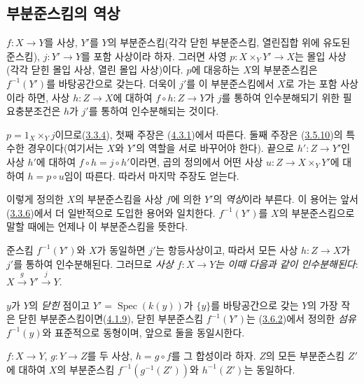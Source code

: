 \subsection{부분준스킴의 역상}
\label{subsection:I.4.4-ko}

\begin{proposition}[4.4.1]
\label{I.4.4.1-ko}
$f:X\to Y$를 사상, $Y'$를 $Y$의 부분준스킴(각각 닫힌 부분준스킴,
열린집합 위에 유도된 준스킴), $j:Y'\to Y$를 포함 사상이라 하자.
그러면 사영 $p:X\times_Y Y'\to X$는 몰입 사상(각각 닫힌 몰입 사상,
열린 몰입 사상)이다. $p$에 대응하는 $X$의 부분준스킴은
$f^{-1}(Y')$를 바탕공간으로 갖는다. 더욱이 $j'$를 이 부분준스킴에서
$X$로 가는 포함 사상이라 하면, 사상 $h:Z\to X$에 대하여
$f\circ h:Z\to Y$가 $j$를 통하여 인수분해되기 위한 필요충분조건은
$h$가 $j'$를 통하여 인수분해되는 것이다.
\end{proposition}

$p=1_X\times_Y j$이므로(\hyperref[I.3.3.4-ko]{3.3.4}), 첫째 주장은
(\hyperref[I.4.3.1-ko]{4.3.1})에서 따른다. 둘째 주장은
(\hyperref[I.3.5.10-ko]{3.5.10})의 특수한 경우이다(여기서는 $X$와
$Y'$의 역할을 서로 바꾸어야 한다). 끝으로 $h':Z\to Y'$인 사상
$h'$에 대하여 $f\circ h=j\circ h'$이라면, 곱의 정의에서 어떤 사상
$u:Z\to X\times_Y Y'$에 대하여 $h=p\circ u$임이 따른다. 따라서
마지막 주장도 얻는다.

이렇게 정의한 $X$의 부분준스킴을 사상 $f$에 의한 $Y'$의
\emph{역상}이라 부른다. 이 용어는 앞서
(\hyperref[I.3.3.6-ko]{3.3.6})에서 더 일반적으로 도입한 용어와
일치한다. $f^{-1}(Y')$를 $X$의 부분준스킴으로 말할 때에는 언제나 이
부분준스킴을 뜻한다.

준스킴 $f^{-1}(Y')$와 $X$가 동일하면 $j'$는 항등사상이고, 따라서
모든 사상 $h:Z\to X$가 $j'$를 통하여 인수분해된다. 그러므로
\emph{사상 $f:X\to Y$는 이때 다음과 같이 인수분해된다}:
$X\xrightarrow{g}Y'\xrightarrow{j}Y$.

$y$가 $Y$의 \emph{닫힌} 점이고
$Y'=\operatorname{Spec}(k(y))$가 $\{y\}$를 바탕공간으로 갖는 $Y$의
가장 작은 닫힌 부분준스킴이면(\hyperref[I.4.1.9-ko]{4.1.9}), 닫힌
부분준스킴 $f^{-1}(Y')$는
(\hyperref[I.3.6.2-ko]{3.6.2})에서 정의한 \emph{섬유} $f^{-1}(y)$와
표준적으로 동형이며, 앞으로 둘을 동일시한다.

\begin{corollary}[4.4.2]
\label{I.4.4.2-ko}
$f:X\to Y$, $g:Y\to Z$를 두 사상, $h=g\circ f$를 그 합성이라 하자.
$Z$의 모든 부분준스킴 $Z'$에 대하여 $X$의 부분준스킴
$f^{-1}(g^{-1}(Z'))$와 $h^{-1}(Z')$는 동일하다.
\end{corollary}

